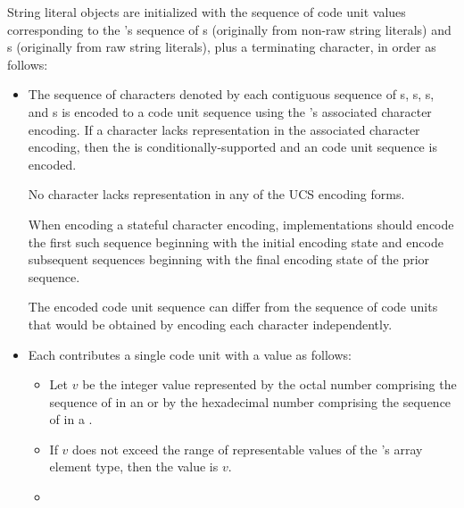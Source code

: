 \pnum
{}%
%
%
String literal objects are initialized with
the sequence of code unit values
corresponding to the 's sequence of
s (originally from non-raw string literals) and
s (originally from raw string literals),
plus a terminating  character,
in order as follows:
\begin{itemize}
\item
The sequence of characters denoted by each contiguous sequence of
s,
s,
s, and
s
is encoded to a code unit sequence
using the 's associated character encoding.
If a character lacks representation in the associated character encoding,
then the  is conditionally-supported and
an
code unit sequence is encoded.
\begin{note}
No character lacks representation in any of the UCS encoding forms.
\end{note}
When encoding a stateful character encoding,
implementations should encode the first such sequence
beginning with the initial encoding state and
encode subsequent sequences
beginning with the final encoding state of the prior sequence.
\begin{note}
The encoded code unit sequence can differ from
the sequence of code units that would be obtained by
encoding each character independently.
\end{note}
\item
Each 
contributes a single code unit with a value as follows:
\begin{itemize}
\item
Let $v$ be the integer value represented by
the octal number comprising
the sequence of  in
an  or by
the hexadecimal number comprising
the sequence of  in
a .
\item
If $v$ does not exceed the range of representable values of
the 's array element type,
then the value is $v$.
\item

\end{itemize}
\end{itemize}
